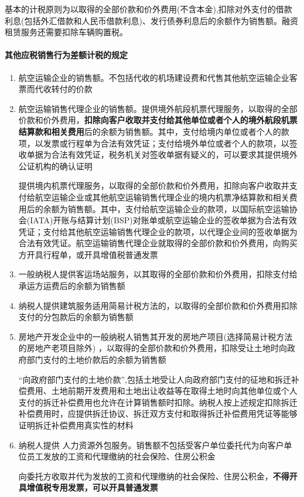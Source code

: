 \documentclass[UTF8,12pt]{ctexart}
\numberwithin{equation}{section} %
\numberwithin{figure}{section}
\numberwithin{table}{section}
\begin{document}
	基本的计税原则为以取得的全部价款和价外费用(不含本金),扣除对外支付的借款利息(包括外汇借款和人民币借款利息)、发行债券利息后的余额作为销售额。融资租赁服务还需要扣除车辆购置税。
	
	\paragraph{其他应税销售行为差额计税的规定}
	\begin{enumerate}
		\item 航空运输企业的销售额。不包括代收的机场建设费和代售其他航空运输企业客票而代收转付的价款
		
		\item 航空运输销售代理企业的销售额。提供境外航段机票代理服务，以取得的全部价款和价外费用，\textbf{扣除向客户收取并支付给其他单位或者个人的境外航段机票结算款和相关费用}后的余额为销售额。其中，支付给境内单位或者个人的款项，以发票或行程单为合法有效凭证；支付给境外单位或者个人的款项，以签收单据为合法有效凭证，税务机关对签收单据有疑义的，可以要求其提供境外公证机构的确认证明
		
		提供境内机票代理服务，以取得的全部价款和价外费用，扣除向客户收取并支付给航空运输企业或其他航空运输销售代理企业的境内机票净结算款和相关费用后的余额为销售额。其中，支付给航空运输企业的款项，以国际航空运输协会(IATA)开账与结算计划(BSP)对账单或航空运输企业的签收单据为合法有效凭证；支付给其他航空运输销售代理企业的款项，以代理企业间的签收单据为合法有效凭证。航空运输销售代理企业就取得的全部价款和价外费用，向购买方开具行程单，或开具增值税普通发票
		
		\item 一般纳税人提供客运场站服务，以其取得的全部价款和价外费用，扣除支付给承运方运费后的余额为销售额
		
		\item 纳税人提供建筑服务适用简易计税方法的，以取得的全部价款和价外费用扣除支付的分包款后的余额为销售额
		
		\item 房地产开发企业中的一般纳税人销售其开发的房地产项目(选择简易计税方法的房地产老项目除外) ，以取得的全部价款和价外费用，扣除受让土地时向政府部门支付的土地价款后的余额为销售额
		
		“向政府部门支付的土地价款”,包括土地受让人向政府部门支付的征地和拆迁补偿费用、土地前期开发费用和土地出让收益等在取得土地时向其他单位或个人支付的拆迁补偿费用也允许在计算销售额时扣除。纳税人按上述规定扣除拆迁补偿费用时，应提供拆迁协议、拆迁双方支付和取得拆迁补偿费用凭证等能够证明拆迁补偿费用真实性的材料
		
		\item 纳税人提供 人力资源外包服务。销售额不包括受客户单位委托代为向客户单位员工发放的工资和代理缴纳的社会保险、住房公积金
		
		向委托方收取并代为发放的工资和代理缴纳的社会保险、住房公积金，\textbf{不得开具增值税专用发票，可以开具普通发票}
	\end{enumerate}
	
\end{document}
